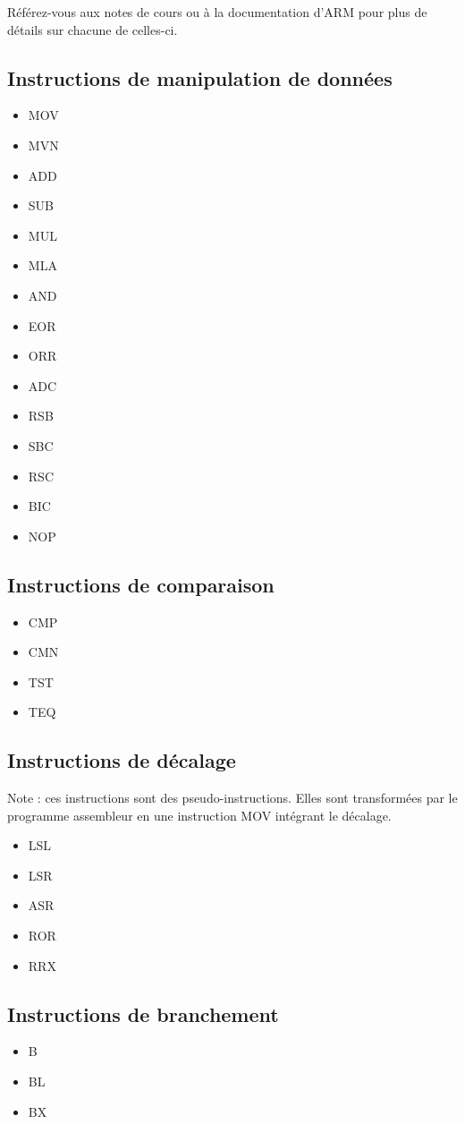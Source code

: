 \documentclass{tufte-handout}
\begin{document}
Référez-vous aux notes de cours ou à la documentation d'ARM pour plus de détails sur chacune de celles-ci.

\subsection{Instructions de manipulation de données}
\begin{itemize}
	\item MOV
	\item MVN
	\item ADD
	\item SUB
	\item MUL
	\item MLA
	\item AND
	\item EOR
	\item ORR
	\item ADC
	\item RSB
	\item SBC
	\item RSC
	\item BIC
	\item NOP
\end{itemize}

\subsection{Instructions de comparaison}
\begin{itemize}
	\item CMP
	\item CMN
	\item TST
	\item TEQ
\end{itemize}

\subsection{Instructions de décalage}
Note : ces instructions sont des pseudo-instructions. Elles sont transformées par le programme assembleur en une instruction MOV intégrant le décalage.
\begin{itemize}
	\item LSL
	\item LSR
	\item ASR
	\item ROR
	\item RRX
\end{itemize}

\subsection{Instructions de branchement}
\begin{itemize}
	\item B
	\item BL
	\item BX
\end{itemize}
\end{document}
